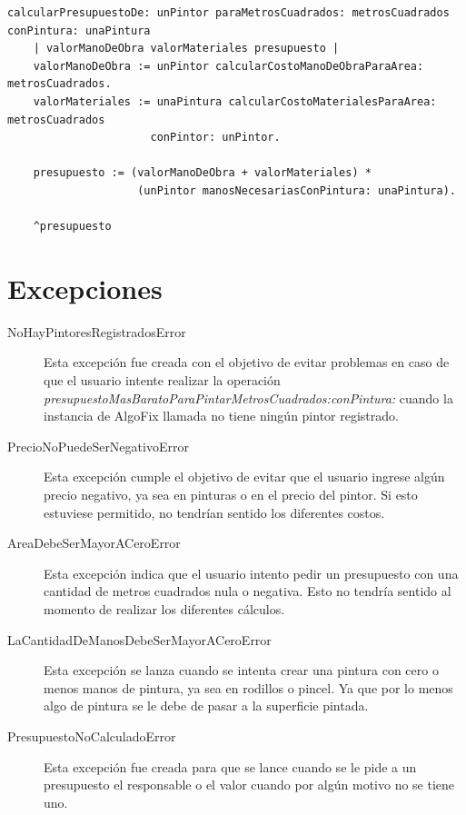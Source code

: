 \documentclass[titlepage,a4paper]{article}
\begin{document}
\begin{verbatim}
calcularPresupuestoDe: unPintor paraMetrosCuadrados: metrosCuadrados conPintura: unaPintura
    | valorManoDeObra valorMateriales presupuesto |
    valorManoDeObra := unPintor calcularCostoManoDeObraParaArea: metrosCuadrados.
    valorMateriales := unaPintura calcularCostoMaterialesParaArea: metrosCuadrados 
                      conPintor: unPintor.

    presupuesto := (valorManoDeObra + valorMateriales) * 
                    (unPintor manosNecesariasConPintura: unaPintura).
	
    ^presupuesto
\end{verbatim}



\section{Excepciones}\label{sec:excepciones}

\begin{description}
\item[NoHayPintoresRegistradosError] Esta excepción fue creada con el objetivo de evitar problemas en caso de que el usuario intente realizar la operación \textit{presupuestoMasBaratoParaPintarMetrosCuadrados:conPintura:} cuando la instancia de AlgoFix llamada no tiene ningún pintor registrado.
\item[PrecioNoPuedeSerNegativoError] Esta excepción cumple el objetivo de evitar que el usuario ingrese algún precio negativo, ya sea en pinturas o en el precio del pintor. Si esto estuviese permitido, no tendrían sentido los diferentes costos.
\item[AreaDebeSerMayorACeroError] Esta excepción indica que el usuario intento pedir un presupuesto con una cantidad de metros cuadrados nula o negativa. Esto no tendría sentido al momento de realizar los diferentes cálculos.
\item[LaCantidadDeManosDebeSerMayorACeroError] Esta excepción se lanza cuando se intenta crear una pintura con cero o menos manos de pintura, ya sea en rodillos o pincel. Ya que por lo menos algo de pintura se le debe de pasar a la superficie pintada.
\item[PresupuestoNoCalculadoError] Esta excepción fue creada para que se lance cuando se le pide a un presupuesto el responsable o el valor cuando por algún motivo no se tiene uno.
\end{description}
\end{document}

